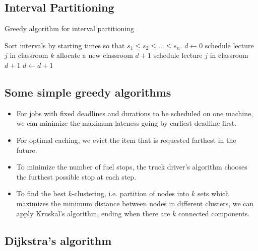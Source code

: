 \documentclass[10pt, oneside, reqno]{amsart}
\theoremstyle{plain}%
\theoremstyle{definition}
\theoremstyle{remark}
\begin{document}
\subsection{Interval Partitioning} %
\label{sub:interval_partitioning}

\begin{algorithm}[H]
    \label{alg:dynamic_rising_trend}
    \caption{Greedy algorithm for interval partitioning}
    \begin{algorithmic}[1]
            \State Sort intervals by starting times so that $s_1 \leq s_2 \leq \dots \leq s_n$.
            \State $d \gets 0$
                    \State schedule lecture $j$ in classroom $k$
                \Else
                    \State allocate a new classroom $d+1$
                    \State schedule lecture $j$ in classroom $d+1$
                    \State $d \gets d+1$
                \EndIf
            \EndFor
    \EndProcedure
    \end{algorithmic}
\end{algorithm}


\subsection{Some simple greedy algorithms} %
\begin{itemize}
\item For jobs with fixed deadlines and durations to be scheduled on one machine, we can minimize the maximum lateness going by earliest deadline first.
\item For optimal caching, we evict the item that is requested farthest in the future.
\item To minimize the number of fuel stops, the truck driver's algorithm chooses the furthest possible stop at each step.
\item To find the best $k$-clustering, i.e. partition of nodes into $k$ sets which maximizes the minimum distance between nodes in different clusters, we can apply Kruskal's algorithm, ending when there are $k$ connected components.
\end{itemize}
\subsection{Dijkstra's algorithm} %
\label{sub:dijkstra_s_algorithm}
\end{document}
